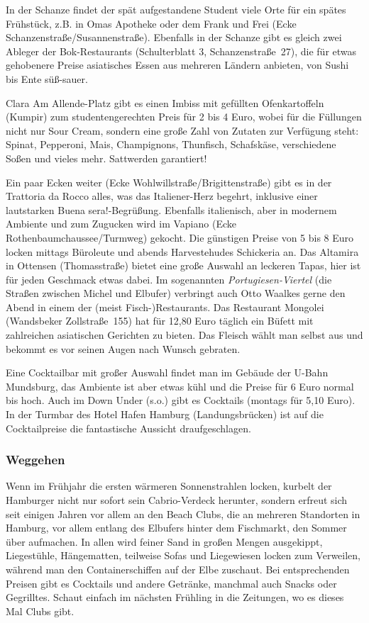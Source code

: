 In der Schanze findet der spät aufgestandene Student viele Orte für ein spätes
Frühstück, z.B. in Omas Apotheke oder dem Frank und Frei (Ecke
Schanzenstraße/Susannenstraße). Ebenfalls in der Schanze gibt es gleich zwei
Ableger der Bok-Restaurants (Schulterblatt 3, Schanzenstraße~27), die für etwas
gehobenere Preise asiatisches Essen aus mehreren Ländern anbieten, von Sushi
bis Ente süß-sauer.

\begin{advice}{Clara}
Am Allende-Platz gibt es einen Imbiss mit gefüllten Ofenkartoffeln (Kumpir) zum
studentengerechten Preis für 2 bis 4 Euro, wobei für die Füllungen nicht nur
Sour Cream, sondern eine große Zahl von Zutaten zur Verfügung steht: Spinat,
Pepperoni, Mais, Champignons, Thunfisch, Schafskäse, verschiedene Soßen und
vieles mehr. Sattwerden garantiert!
\end{advice}

Ein paar Ecken weiter (Ecke Wohlwillstraße/Brigittenstraße) gibt es in der
Trattoria da Rocco alles, was das Italiener-Herz begehrt, inklusive einer
lautstarken \glqq Buena sera!\grqq-Begrüßung. Ebenfalls italienisch, aber in
modernem Ambiente und zum Zugucken wird im Vapiano (Ecke
Rothenbaumchaussee/Turmweg) gekocht. Die günstigen Preise von 5 bis 8 Euro
locken mittags Büroleute und abends Harvestehudes Schickeria an. Das Altamira
in Ottensen (Thomasstraße) bietet eine große Auswahl an leckeren Tapas, hier
ist für jeden Geschmack etwas dabei. Im sogenannten \emph{Portugiesen-Viertel}
(die Straßen zwischen Michel und Elbufer) verbringt auch Otto Waalkes gerne den
Abend in einem der (meist Fisch-)Restaurants. Das Restaurant Mongolei
(Wandsbeker Zollstraße~155) hat für 12,80 Euro täglich ein Büfett mit
zahlreichen asiatischen Gerichten zu bieten. Das Fleisch wählt man selbst aus
und bekommt es vor seinen Augen nach Wunsch gebraten.

Eine Cocktailbar mit großer Auswahl findet man im Gebäude der U-Bahn Mundsburg,
das Ambiente ist aber etwas kühl und die Preise für 6 Euro normal bis hoch. Auch
im Down Under (s.o.) gibt es Cocktails (montags für 5,10 Euro). In der Turmbar
des Hotel Hafen Hamburg (Landungsbrücken) ist auf die Cocktailpreise die
fantastische Aussicht draufgeschlagen.

\subsubsection{Weggehen}

Wenn im Frühjahr die ersten wärmeren Sonnenstrahlen locken, kurbelt der
Hamburger nicht nur sofort sein Cabrio-Verdeck herunter, sondern erfreut sich
seit einigen Jahren vor allem an den Beach Clubs, die an mehreren Standorten in
Hamburg, vor allem entlang des Elbufers hinter dem Fischmarkt, den Sommer über
aufmachen. In allen wird feiner Sand in großen Mengen ausgekippt, Liegestühle,
Hängematten, teilweise Sofas und Liegewiesen locken zum Verweilen, während man
den Containerschiffen auf der Elbe zuschaut. Bei entsprechenden Preisen gibt es
Cocktails und andere Getränke, manchmal auch Snacks oder Gegrilltes. Schaut
einfach im nächsten Frühling in die Zeitungen, wo es dieses Mal Clubs gibt.

